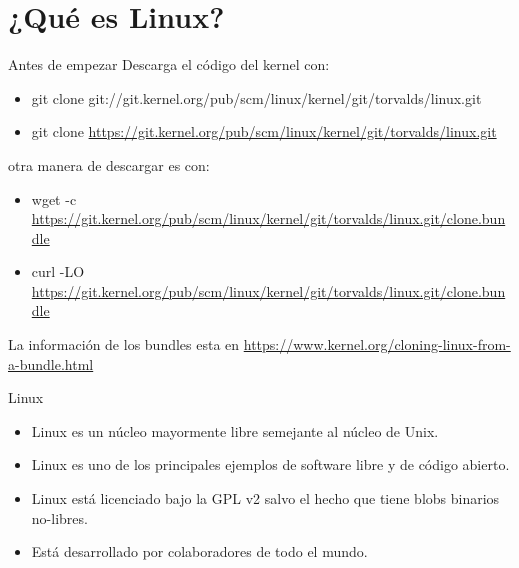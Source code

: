 
\section{¿Qué es Linux?}

\begin{frame}[c]{Antes de empezar}
  Descarga el código del kernel con:
  \begin{itemize}
    \item git clone git://git.kernel.org/pub/scm/linux/kernel/git/torvalds/linux.git
    \item git clone
      \href{https://git.kernel.org/pub/scm/linux/kernel/git/torvalds/linux.git}
      {https://git.kernel.org/pub/scm/linux/kernel/git/torvalds/linux.git}
  \end{itemize}

  \vspace{\baselineskip}
  otra manera de descargar es con:
  \begin{itemize}
    \item wget -c
      \href{https://git.kernel.org/pub/scm/linux/kernel/git/torvalds/linux.git/clone.bundle}
      {https://git.kernel.org/pub/scm/linux/kernel/git/torvalds/linux.git/clone.bundle}
    \item curl -LO
      \href{https://git.kernel.org/pub/scm/linux/kernel/git/torvalds/linux.git/clone.bundle}
      {https://git.kernel.org/pub/scm/linux/kernel/git/torvalds/linux.git/clone.bundle}
  \end{itemize}

  \vspace{\baselineskip}
  La información de los bundles esta en 
  \href{https://www.kernel.org/cloning-linux-from-a-bundle.html}
  {https://www.kernel.org/cloning-linux-from-a-bundle.html}
\end{frame}

\begin{frame}[c]{Linux}
  \begin{itemize}
    \item Linux es un núcleo mayormente libre semejante al núcleo de Unix.
    \pausa
    \item Linux es uno de los principales ejemplos de software libre y de
      código abierto.
    \pausa
    \item Linux está licenciado bajo la GPL v2 salvo el hecho que tiene
      blobs binarios no-libres.
    \pausa
    \item Está desarrollado por colaboradores de todo el mundo.
  \end{itemize}
\end{frame}

